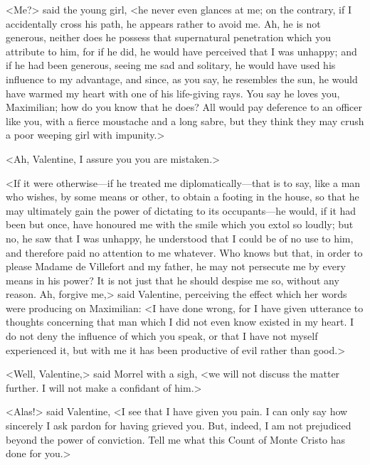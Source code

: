  <Me?> said the young girl, <he never even glances at me; on the contrary, if I accidentally cross his path, he appears rather to avoid me. Ah, he is not generous, neither does he possess that supernatural penetration which you attribute to him, for if he did, he would have perceived that I was unhappy; and if he had been generous, seeing me sad and solitary, he would have used his influence to my advantage, and since, as you say, he resembles the sun, he would have warmed my heart with one of his life-giving rays. You say he loves you, Maximilian; how do you know that he does? All would pay deference to an officer like you, with a fierce moustache and a long sabre, but they think they may crush a poor weeping girl with impunity.> 

 <Ah, Valentine, I assure you you are mistaken.> 

 <If it were otherwise—if he treated me diplomatically—that is to say, like a man who wishes, by some means or other, to obtain a footing in the house, so that he may ultimately gain the power of dictating to its occupants—he would, if it had been but once, have honoured me with the smile which you extol so loudly; but no, he saw that I was unhappy, he understood that I could be of no use to him, and therefore paid no attention to me whatever. Who knows but that, in order to please Madame de Villefort and my father, he may not persecute me by every means in his power? It is not just that he should despise me so, without any reason. Ah, forgive me,> said Valentine, perceiving the effect which her words were producing on Maximilian: <I have done wrong, for I have given utterance to thoughts concerning that man which I did not even know existed in my heart. I do not deny the influence of which you speak, or that I have not myself experienced it, but with me it has been productive of evil rather than good.> 

 <Well, Valentine,> said Morrel with a sigh, <we will not discuss the matter further. I will not make a confidant of him.> 

 <Alas!> said Valentine, <I see that I have given you pain. I can only say how sincerely I ask pardon for having grieved you. But, indeed, I am not prejudiced beyond the power of conviction. Tell me what this Count of Monte Cristo has done for you.>

